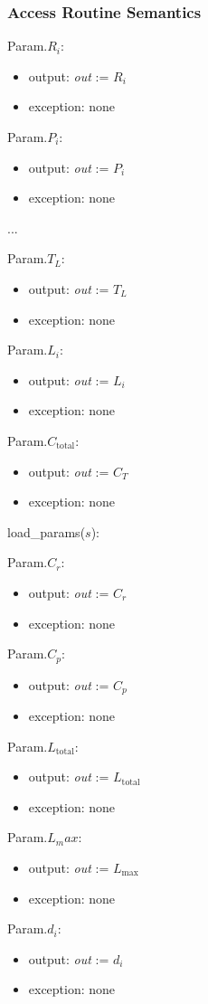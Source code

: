 \documentclass[12pt, titlepage]{article}
\begin{document}
\subsubsection{Access Routine Semantics}

\noindent Param.$R_i$:
\begin{itemize}
\item output: \textit{out} := $R_i$
\item exception: none
\end{itemize}

\noindent Param.$P_i$:
\begin{itemize}
\item output: \textit{out} := $P_i$
\item exception: none
\end{itemize}

...
~\newline

\noindent Param.$T_L$:
\begin{itemize}
\item output: \textit{out} := $T_L$
\item exception: none
\end{itemize}

\noindent Param.$L_i$:
\begin{itemize}
\item output: \textit{out} := $L_i$
\item exception: none
\end{itemize}
\noindent Param.$C_\text{total}$:
\begin{itemize}
\item output: \textit{out} := $C_T$
\item exception: none
\end{itemize}
\noindent load\_params($s$):

\noindent Param.$C_r$:
\begin{itemize}
\item output: \textit{out} := $C_r$
\item exception: none
\end{itemize}
\noindent Param.$C_p$:
\begin{itemize}
\item output: \textit{out} := $C_p$
\item exception: none
\end{itemize}
\noindent Param.$L_\text{total}$:
\begin{itemize}
\item output: \textit{out} := $L_\text{total}$
\item exception: none
\end{itemize}
\noindent Param.$L_max$:
\begin{itemize}
\item output: \textit{out} := $L_\text{max}$
\item exception: none
\end{itemize}
\noindent Param.$d_i$:
\begin{itemize}
\item output: \textit{out} := $d_i$
\item exception: none
\end{itemize}
\end{document}
